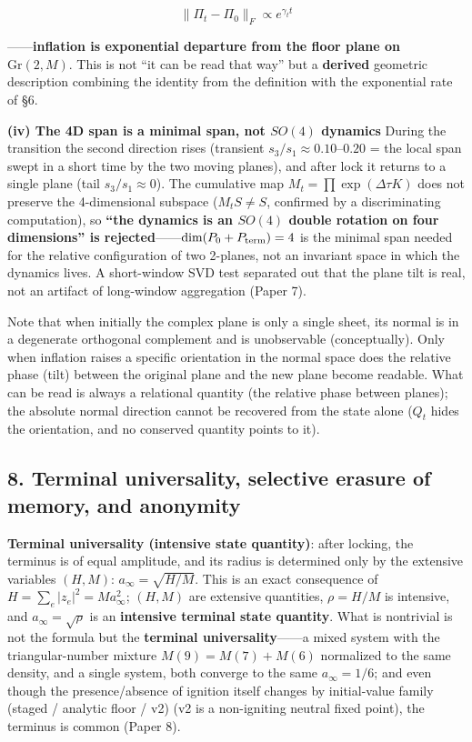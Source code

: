 \documentclass[
  a4paper,
]{ltjsarticle}
\begin{document}
\[\boxed{\ \|\Pi_t-\Pi_0\|_F\propto e^{\gamma_t t}\ }\]

------\textbf{inflation is exponential departure from the floor plane on
\(\mathrm{Gr}(2,M)\)}. This is not ``it can be read that way'' but a
\textbf{derived} geometric description combining the identity from the
definition with the exponential rate of §6.

\textbf{(iv) The 4D span is a minimal span, not \(SO(4)\) dynamics}
During the transition the second direction rises (transient
\(s_3/s_1\approx0.10\)--\(0.20\) = the local span swept in a short time
by the two moving planes), and after lock it returns to a single plane
(tail \(s_3/s_1\approx0\)). The cumulative map
\(M_t=\prod\exp(\Delta\tau K)\) does not preserve the 4-dimensional
subspace (\(M_tS\neq S\), confirmed by a discriminating computation), so
\textbf{``the dynamics is an \(SO(4)\) double rotation on four
dimensions'' is rejected}------\(\dim(P_0+P_{\rm term})=4\) is the
minimal span needed for the relative configuration of two 2-planes, not
an invariant space in which the dynamics lives. A short-window SVD test
separated out that the plane tilt is real, not an artifact of
long-window aggregation (Paper 7).

Note that when initially the complex plane is only a single sheet, its
normal is in a degenerate orthogonal complement and is unobservable
(conceptually). Only when inflation raises a specific orientation in the
normal space does the relative phase (tilt) between the original plane
and the new plane become readable. What can be read is always a
relational quantity (the relative phase between planes); the absolute
normal direction cannot be recovered from the state alone (\(Q_t\) hides
the orientation, and no conserved quantity points to it).

\subsection{8. Terminal universality, selective erasure of memory, and
anonymity}\label{terminal-universality-selective-erasure-of-memory-and-anonymity}

\textbf{Terminal universality (intensive state quantity)}: after
locking, the terminus is of equal amplitude, and its radius is
determined only by the extensive variables \((H,M)\):
\(a_\infty=\sqrt{H/M}\). This is an exact consequence of
\(H=\sum_e|z_e|^2=Ma_\infty^2\); \((H,M)\) are extensive quantities,
\(\rho=H/M\) is intensive, and \(a_\infty=\sqrt\rho\) is an
\textbf{intensive terminal state quantity}. What is nontrivial is not
the formula but the \textbf{terminal universality}------a mixed system
with the triangular-number mixture \(M(9)=M(7)+M(6)\) normalized to the
same density, and a single system, both converge to the same
\(a_\infty=1/6\); and even though the presence/absence of ignition
itself changes by initial-value family (staged / analytic floor / v2)
(v2 is a non-igniting neutral fixed point), the terminus is common
(Paper 8).
\end{document}
